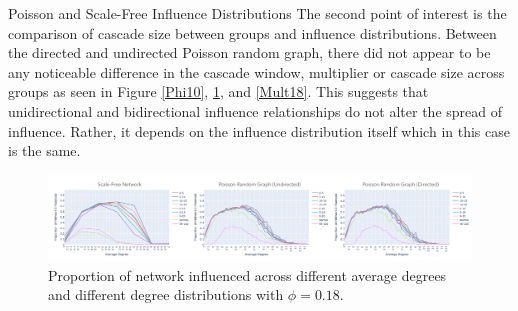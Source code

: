\documentclass[10pt, oneside, reqno]{amsart}
\makeatletter
\theoremstyle{plain}%
\theoremstyle{definition}
\theoremstyle{remark}
\renewcommand\subsection{\@startsection{subsection}{2}%
  \z@{.5\linespacing\@plus.7\linespacing}{-.5em}%
  {\normalfont\scshape}}
\makeatother
\begin{document}
\subsection{Poisson and Scale-Free Influence Distributions}
The second point of interest is the comparison of cascade size between groups and influence distributions. 
Between the directed and undirected Poisson random graph, there did not appear to be any noticeable difference in the cascade window, multiplier or cascade size across groups as seen in Figure \ref{Phi10}, \ref{Phi18}, and \ref{Mult18}.
This suggests that unidirectional and bidirectional influence relationships do not alter the spread of influence. 
Rather, it depends on the influence distribution itself which in this case is the same.

\begin{figure}[ht]
    \includegraphics[scale=0.2]{Report/figs/SFRGRG18.png}
    \caption{Proportion of network influenced across different average degrees and different degree distributions with $\phi = 0.18$.}
    \label{Phi18}
\end{figure}
\end{document}
